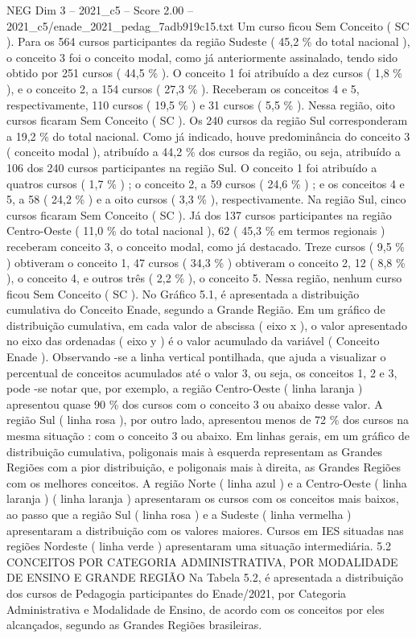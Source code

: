 \begin{textsample}{NEG Dim 3 – 2021\_c5 – Score 2.00 – 2021\_c5/enade\_2021\_pedag\_7adb919c15.txt}
Um curso ficou Sem Conceito ( SC ).
Para os 564 cursos participantes da região Sudeste ( 45,2 \% do total nacional ), o conceito 3 foi o conceito modal, como já anteriormente assinalado, tendo sido obtido por 251 cursos ( 44,5 \% ).
O conceito 1 foi atribuído a dez cursos ( 1,8 \% ), e o conceito 2, a 154 cursos ( 27,3 \% ).
Receberam os conceitos 4 e 5, respectivamente, 110 cursos ( 19,5 \% ) e 31 cursos ( 5,5 \% ).
Nessa região, oito cursos ficaram Sem Conceito ( SC ).
Os 240 cursos da região Sul corresponderam a 19,2 \% do total nacional.
Como já indicado, houve predominância do conceito 3 ( conceito modal ), atribuído a 44,2 \% dos cursos da região, ou seja, atribuído a 106 dos 240 cursos participantes na região Sul.
O conceito 1 foi atribuído a quatros cursos ( 1,7 \% ) ; o conceito 2, a 59 cursos ( 24,6 \% ) ; e os conceitos 4 e 5, a 58 ( 24,2 \% ) e a oito cursos ( 3,3 \% ), respectivamente.
Na região Sul, cinco cursos ficaram Sem Conceito ( SC ).
Já dos 137 cursos participantes na região Centro-Oeste ( 11,0 \% do total nacional ), 62 ( 45,3 \% em termos regionais ) receberam conceito 3, o conceito modal, como já destacado.
Treze cursos ( 9,5 \% ) obtiveram o conceito 1, 47 cursos ( 34,3 \% ) obtiveram o conceito 2, 12 ( 8,8 \% ), o conceito 4, e outros três ( 2,2 \% ), o conceito 5.
Nessa região, nenhum curso ficou Sem Conceito ( SC ).
No Gráfico 5.1, é apresentada a distribuição cumulativa do Conceito Enade, segundo a Grande Região.
Em um gráfico de distribuição cumulativa, em cada valor de abscissa ( eixo x ), o valor apresentado no eixo das ordenadas ( eixo y ) é o valor acumulado da variável ( Conceito Enade ).
Observando -se a linha vertical pontilhada, que ajuda a visualizar o percentual de conceitos acumulados até o valor 3, ou seja, os conceitos 1, 2 e 3, pode -se notar que, por exemplo, a região Centro-Oeste ( linha laranja ) apresentou quase 90 \% dos cursos com o conceito 3 ou abaixo desse valor.
A região Sul ( linha rosa ), por outro lado, apresentou menos de 72 \% dos cursos na mesma situação : com o conceito 3 ou abaixo.
Em linhas gerais, em um gráfico de distribuição cumulativa, poligonais mais à esquerda representam as Grandes Regiões com a pior distribuição, e poligonais mais à direita, as Grandes Regiões com os melhores conceitos.
A região Norte ( linha azul ) e a Centro-Oeste ( linha laranja ) ( linha laranja ) apresentaram os cursos com os conceitos mais baixos, ao passo que a região Sul ( linha rosa ) e a Sudeste ( linha vermelha ) apresentaram a distribuição com os valores maiores.
Cursos em IES situadas nas regiões Nordeste ( linha verde ) apresentaram uma situação intermediária. 5.2 CONCEITOS POR CATEGORIA ADMINISTRATIVA, POR MODALIDADE DE ENSINO E GRANDE REGIÃO Na Tabela 5.2, é apresentada a distribuição dos cursos de Pedagogia participantes do Enade/2021, por Categoria Administrativa e Modalidade de Ensino, de acordo com os conceitos por eles alcançados, segundo as Grandes Regiões brasileiras.

\end{textsample}

